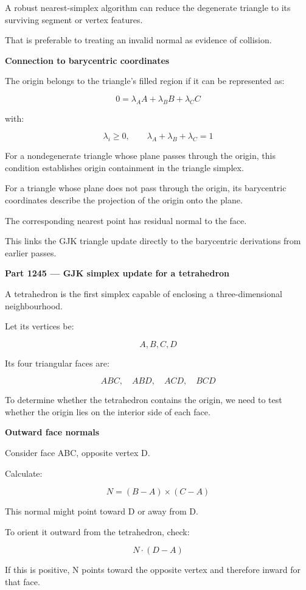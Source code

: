 A robust nearest-simplex algorithm can reduce the degenerate triangle to its surviving segment or vertex features.

That is preferable to treating an invalid normal as evidence of collision.

\textbf{Connection to barycentric coordinates}

The origin belongs to the triangle's filled region if it can be represented as:

\[
0=\lambda_AA+\lambda_BB+\lambda_CC
\]

with:

\[
\lambda_i\ge0,\qquad \lambda_A+\lambda_B+\lambda_C=1
\]

For a nondegenerate triangle whose plane passes through the origin, this condition establishes origin containment in the triangle simplex.

For a triangle whose plane does not pass through the origin, its barycentric coordinates describe the projection of the origin onto the plane.

The corresponding nearest point has residual normal to the face.

This links the GJK triangle update directly to the barycentric derivations from earlier passes.

\textbf{Part 1245 --- GJK simplex update for a tetrahedron}

A tetrahedron is the first simplex capable of enclosing a three-dimensional neighbourhood.

Let its vertices be:

\[
A,B,C,D
\]

Its four triangular faces are:

\[
ABC,\quad ABD,\quad ACD,\quad BCD
\]

To determine whether the tetrahedron contains the origin, we need to test whether the origin lies on the interior side of each face.

\textbf{Outward face normals}

Consider face ABC, opposite vertex D.

Calculate:

\[
N=(B-A)\times(C-A)
\]

This normal might point toward D or away from D.

To orient it outward from the tetrahedron, check:

\[
N\cdot(D-A)
\]

If this is positive, N points toward the opposite vertex and therefore inward for that face.

